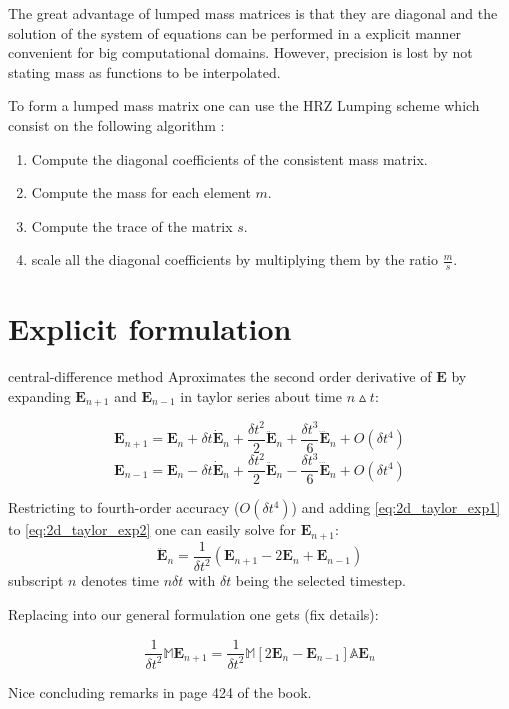 The great advantage of lumped mass matrices is that they are diagonal and the solution of the system of equations can be performed in a explicit manner convenient for big computational domains.
However, precision is lost by not stating mass as functions to be interpolated. 

To form a lumped mass matrix one can use the HRZ Lumping scheme 
which consist on the following algorithm \cite{RobertD.Cook1989}:

\begin{enumerate}
\item Compute the diagonal coefficients of the consistent mass matrix.
\item Compute the mass for each element $m$.
\item Compute the trace of the matrix $s$.
\item scale all the diagonal coefficients by multiplying them by the ratio $\frac{m}{s}$.
\end{enumerate}

\section{Explicit formulation}
central-difference method
Aproximates the second order derivative of $\mathbf{E}$ by expanding $\mathbf{E}_{n+1}$ and $\mathbf{E}_{n-1}$  in taylor series about time $n \vartriangle t$:

\begin{equation}
\mathbf{E}_{n+1} = \mathbf{E}_n + \delta t \dot{\mathbf{E}}_n +\frac{\delta t^2}{2} \ddot{\mathbf{E}}_n +\frac{\delta t^3}{6} \dddot{\mathbf{E}}_n+ O(\delta t^4)
\label{eq:2d_taylor_exp1}
\end{equation}
\begin{equation}
\mathbf{E}_{n-1} = \mathbf{E}_n - \delta t \dot{\mathbf{E}}_n +\frac{\delta t^2}{2} \ddot{\mathbf{E}}_n-\frac{\delta t^3}{6} \dddot{\mathbf{E}}_n+ O(\delta t^4)
\label{eq:2d_taylor_exp2}
\end{equation}

Restricting to fourth-order accuracy ($O(\delta t^4)$) and  adding \ref{eq:2d_taylor_exp1} to \ref{eq:2d_taylor_exp2} one can easily solve for $\mathbf{E}_{n+1}$:
\begin{equation}
\ddot{\mathbf{E}}_n = \frac{1}{\delta t^2}\left(\mathbf{E}_{n+1}-2 \mathbf{E}_{n} + \mathbf{E}_{n-1}\right)
\label{eq:central-difference}
\end{equation}
subscript $n$ denotes time $n\delta t$ with $\delta t$ being the selected timestep.

Replacing into our general formulation one gets (fix details):

\begin{equation}
\frac{1}{\delta t^2} \mathbb{M} \mathbf{E}_{n+1} = \frac{1}{\delta t^2}\mathbb{M}\left[2
\mathbf{E}_{n}-\mathbf{E}_{n-1}
\right] \mathbb{A}\mathbf{E}_n 	 
\end{equation}

Nice concluding remarks in page 424 of the book.
